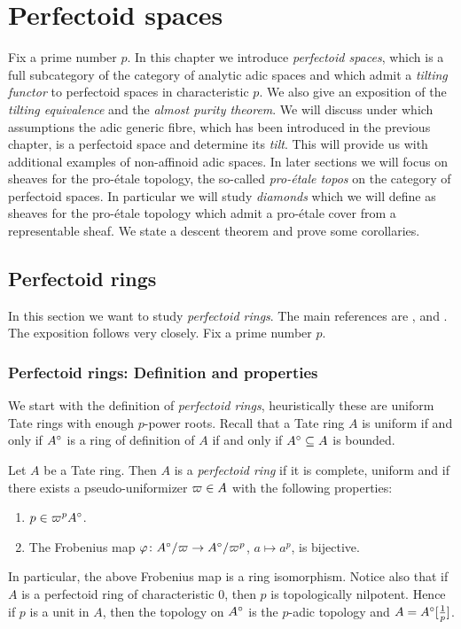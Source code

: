 \chapter{Perfectoid spaces}
Fix a prime number $p$.
In this chapter we introduce \emph{perfectoid spaces}, which is a full subcategory of the category of analytic adic spaces and which admit a \emph{tilting functor} to perfectoid spaces in characteristic $p$. We also give an exposition of the \emph{tilting equivalence} and the \emph{almost purity theorem}. We will discuss under which assumptions the adic generic fibre, which has been introduced in the previous chapter, is a perfectoid space and determine its \emph{tilt}. This will provide us with additional examples of non-affinoid adic spaces. In later sections we will focus on sheaves for the  pro-\'{e}tale topology, the so-called \emph{pro-\'{e}tale topos} on the category of perfectoid spaces. In particular we will study \emph{diamonds} which we will define as sheaves for the pro-\'{e}tale topology which admit a pro-\'{e}tale cover from a representable sheaf. We state a descent theorem and prove some corollaries.


\section{Perfectoid rings}
In this section we want to study \emph{perfectoid rings}. The main references are \cite{Scholze12}, \cite{Scholzeetcoh21} and \cite{Fontaine13}.
The exposition follows \cite{Morel19} very closely. Fix a prime number $p$.

\subsection{Perfectoid rings: Definition and properties}
We start with the definition of  \emph{perfectoid rings}, heuristically these are uniform Tate rings with enough $p$-power roots. Recall that a Tate ring $A$ is uniform if and only if $A{^{\circ}}$ is a ring of definition of $A$ if and only if
$A{^{\circ}}\subseteq A$ is bounded.

\begin{definition}\label{defperfectoidring}
Let $A$ be a Tate ring. Then $A$ is a \emph{perfectoid ring} if it is complete, uniform and if there exists a pseudo-uniformizer $\varpi\in A$ with the following properties:
\begin{enumerate}
\item $p\in\varpi^{p}A{^{\circ}}$.
\item The Frobenius map $\varphi\colon A{^{\circ}}/\varpi\to A{^{\circ}}/\varpi^p$, $a\mapsto a^p$, is bijective.
\end{enumerate}
\end{definition}
In particular, the above Frobenius map is a ring isomorphism.
Notice also that if $A$ is a perfectoid ring of characteristic $0$, then $p$ is topologically nilpotent.
Hence if $p$ is a unit in $A$, then the topology on $A{^{\circ}}$ is the $p$-adic topology and $A=A{^{\circ}}[\frac{1}{p}]$.

